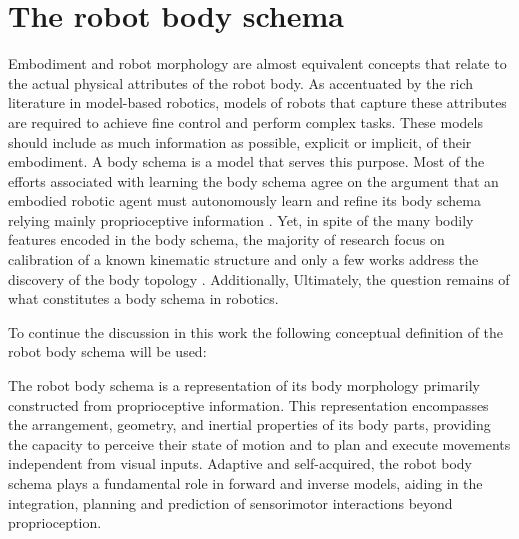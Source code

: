 \section{The robot body schema}
Embodiment and robot morphology are almost equivalent concepts that relate to the actual physical attributes of the robot body. As accentuated by the rich literature in model-based robotics, models of robots that capture these attributes are required to achieve fine control and perform complex tasks. These models should include as much information as possible, explicit or implicit, of their embodiment. A body schema is a model that serves this purpose. Most of the efforts associated with learning the body schema agree on the argument that an embodied robotic agent must autonomously learn and refine its body schema relying mainly proprioceptive information \cite{Morasso2015Revisitingbodyschema, Hoffmann2010Bodyschemarobotics}. Yet, in spite of the many bodily features encoded in the body schema, the majority of research focus on calibration of a known kinematic structure \cite{Hart2010Roboticselfmodels,Sturm2012Bodyschemalearning,Hersch2008Onlinelearningbody} and only a few works address the discovery of the body topology \cite{Bongard2006Resilientmachinescontinuous}. Additionally,  Ultimately, the question remains of what constitutes a body schema in robotics. 

To continue the discussion in this work the following conceptual definition of the robot body schema will be used:
\begin{shaded}
	\begin{definition}\label{def:robot_body_schema}
		The robot body schema is a representation of its body morphology primarily constructed from proprioceptive information. This representation encompasses the arrangement, geometry, and inertial properties of its body parts, providing the capacity to perceive their state of motion and to plan and execute movements independent from visual inputs. Adaptive and self-acquired, the robot body schema plays a fundamental role in forward and inverse models, aiding in the integration, planning and prediction of sensorimotor interactions beyond proprioception.
	\end{definition}
\end{shaded}



